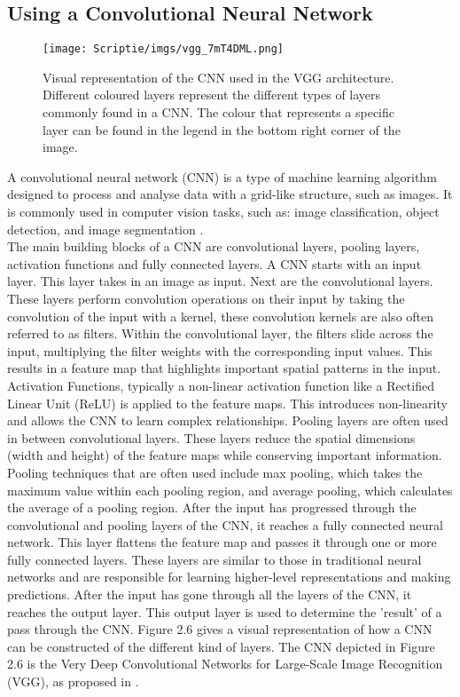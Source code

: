 \documentclass{uva-inf-bachelor-thesis}
\begin{document}
        \subsection{Using a Convolutional Neural Network}
            \begin{figure}[H]
            \centering
            \texttt{[image: Scriptie/imgs/vgg\_7mT4DML.png]}
            \caption{Visual representation of the CNN used in the VGG architecture. Different coloured layers represent the different types of layers commonly found in a CNN. The colour that represents a specific layer can be found in the legend in the bottom right corner of the image. \cite{Explained}}
            \end{figure}
            A convolutional neural network (CNN) is a type of machine learning algorithm designed to process and analyse data with a grid-like structure, such as images. It is commonly used in computer vision tasks, such as: image classification, object detection, and image segmentation \cite{cnn}.\\
            The main building blocks of a CNN are convolutional layers, pooling layers, activation functions and fully connected layers. A CNN starts with an input layer. This layer takes in an image as input. Next are the convolutional layers. These layers perform convolution operations on their input by taking the convolution of the input with a kernel, these convolution kernels are also often referred to as filters. Within the convolutional layer, the filters slide across the input, multiplying the filter weights with the corresponding input values. This results in a feature map that highlights important spatial patterns in the input. Activation Functions, typically a non-linear activation function like a Rectified Linear Unit (ReLU) \cite{relu} is applied to the feature maps. This introduces non-linearity and allows the CNN to learn complex relationships. Pooling layers are often used in between convolutional layers. These layers reduce the spatial dimensions (width and height) of the feature maps while conserving important information. Pooling techniques that are often used include max pooling, which takes the maximum value within each pooling region, and average pooling, which calculates the average of a pooling region. After the input has progressed through the convolutional and pooling layers of the CNN, it reaches a fully connected neural network. This layer flattens the feature map and passes it through one or more fully connected layers. These layers are similar to those in traditional neural networks and are responsible for learning higher-level representations and making predictions. After the input has gone through all the layers of the CNN, it reaches the output layer. This output layer is used to determine the 'result' of a pass through the CNN. Figure 2.6 gives a visual representation of how a CNN can be constructed of the different kind of layers. The CNN depicted in Figure 2.6 is the Very Deep Convolutional Networks for Large-Scale Image Recognition (VGG), as proposed in \cite{vgg}.
\end{document}
